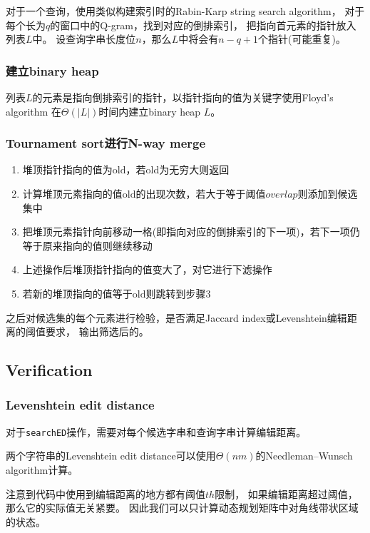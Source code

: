 对于一个查询，使用类似构建索引时的Rabin-Karp string search algorithm，
对于每个长为$q$的窗口中的Q-gram，找到对应的倒排索引，
把指向首元素的指针放入列表$L$中。
设查询字串长度位$n$，那么$L$中将会有$n-q+1$个指针(可能重复)。

\subsubsection{建立binary heap}

列表$L$的元素是指向倒排索引的指针，以指针指向的值为关键字使用Floyd's algorithm
在$\Theta(|L|)$时间内建立binary heap $L$。

\subsubsection{Tournament sort进行N-way merge}

\begin{enumerate}
  \item 堆顶指针指向的值为$\mathrm{old}$，若old为无穷大则返回
  \item 计算堆顶元素指向的值$\mathrm{old}$的出现次数，若大于等于阈值$\mathit{overlap}$则添加到候选集中
  \item 把堆顶元素指针向前移动一格(即指向对应的倒排索引的下一项)，若下一项仍等于原来指向的值则继续移动
  \item 上述操作后堆顶指针指向的值变大了，对它进行下滤操作
  \item 若新的堆顶指向的值等于$\mathrm{old}$则跳转到步骤3
\end{enumerate}

之后对候选集的每个元素进行检验，是否满足Jaccard index或Levenshtein编辑距离的阈值要求，
输出筛选后的。

\subsection{Verification}

\subsubsection{Levenshtein edit distance}

对于\texttt{searchED}操作，需要对每个候选字串和查询字串计算编辑距离。

两个字符串的Levenshtein edit distance可以使用$\Theta(nm)$的Needleman–Wunsch algorithm计算。

注意到代码中使用到编辑距离的地方都有阈值$\mathit{th}$限制，
如果编辑距离超过阈值，那么它的实际值无关紧要。
因此我们可以只计算动态规划矩阵中对角线带状区域的状态。

